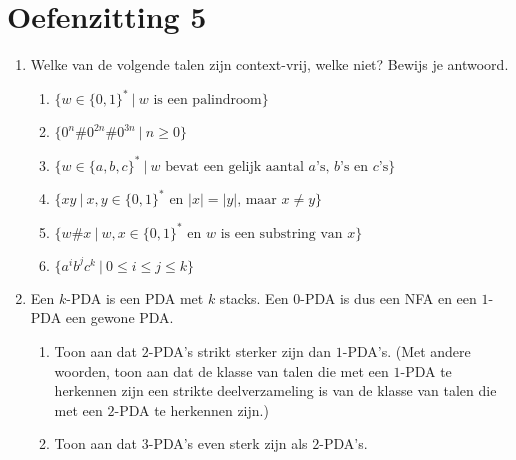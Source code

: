 \documentclass[a4paper]{article}
\begin{document}
\pagestyle{empty}

\section*{Oefenzitting 5}

\begin{enumerate}
   \item Welke van de volgende talen zijn context-vrij, welke niet? Bewijs je antwoord.
      \begin{enumerate}
			\item $\{ w \in \{0,1\}^* \ | \ \text{$w$ is een palindroom}\}$
         \item $\{ 0^n\#0^{2n}\#0^{3n} \ | \ n \geq 0 \}$
         \item $\{ w \in \{a,b,c\}^* \ | \ \text{$w$ bevat een gelijk aantal $a$'s, $b$'s en $c$'s} \}$
         \item $\{ xy \ | \ \text{$x,y \in \{0,1\}^*$ en $|x| = |y|$, maar $x \neq y$} \}$
         \item $\{ w \# x \ | \ \text{$w,x \in \{0,1\}^*$ en $w$ is een substring van $x$} \}$
			\item $\{a^ib^jc^k \ | \ 0 \leq i \leq j \leq k \}$
      \end{enumerate}
	\item Een $k$-PDA is een PDA met $k$ stacks. Een $0$-PDA is dus een NFA en een $1$-PDA een gewone PDA. 
   \begin{enumerate}
      \item Toon aan dat $2$-PDA's strikt sterker zijn dan $1$-PDA's. (Met andere woorden, toon aan dat de klasse van talen die met een $1$-PDA te herkennen zijn een strikte deelverzameling is van de klasse van talen die met een $2$-PDA te herkennen zijn.)
      \item Toon aan dat $3$-PDA's even sterk zijn als $2$-PDA's.
   \end{enumerate}


\end{enumerate}
\end{document}
